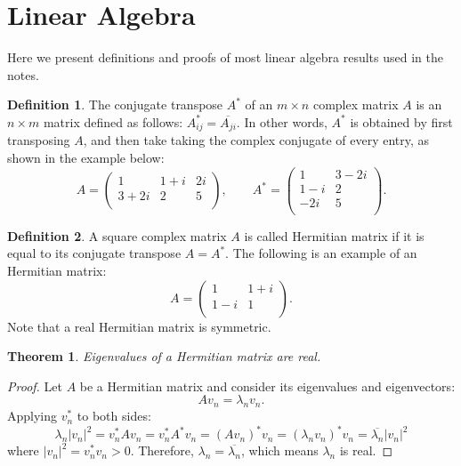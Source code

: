 \documentclass{article}
\newtheorem{theorem}{Theorem}[section]
\theoremstyle{definition}
\newtheorem{definition}{Definition}[section]
\begin{document}
\section{Linear Algebra}
Here we present definitions and proofs of most linear algebra results used in the notes.
\begin{definition}
The conjugate transpose $A^*$ of an $m\times n$ complex matrix $A$ is an $n \times m$ matrix defined as follows: $A^*_{ij}=\overline{A_{ji}}$. In other words, $A^*$ is obtained by first transposing $A$, and then take taking the complex conjugate of every entry, as shown in the example below:
\begin{equation}
    A =
    \begin{pmatrix}
        1 & 1+i & 2i \\
        3+2i & 2 & 5 \\
    \end{pmatrix},
    \qquad
    A^* =
    \begin{pmatrix}
        1 & 3-2i \\
        1-i & 2 \\
        -2i & 5 \\
    \end{pmatrix}.
\end{equation}
\end{definition}

\begin{definition}
A square complex matrix $A$ is called Hermitian matrix if it is equal to its conjugate transpose $A=A^*$. The following is an example of an Hermitian matrix:
\begin{equation}
    A =
    \begin{pmatrix}
        1 & 1+i \\
        1-i & 1 \\
    \end{pmatrix}.
\end{equation}
Note that a real Hermitian matrix is symmetric.
\end{definition}

\begin{theorem}
Eigenvalues of a Hermitian matrix are real.
\end{theorem}
 
\begin{proof}
Let $A$ be a Hermitian matrix and consider its eigenvalues and eigenvectors:
\begin{equation}
    Av_n=\lambda_nv_n.
\end{equation}
Applying $v_n^*$ to both sides:
\begin{equation}
    \lambda_n |v_n|^2 = v_n^*Av_n = v_n^*A^*v_n = (Av_n)^*v_n = (\lambda_nv_n)^*v_n = \overline{\lambda_n}|v_n|^2
    \label{appendix-eq:eig}
\end{equation}
where $|v_n|^2=v_n^*v_n>0$. Therefore, $\lambda_n=\overline{\lambda_n}$, which means $\lambda_n$ is real.
\end{proof}
\end{document}
